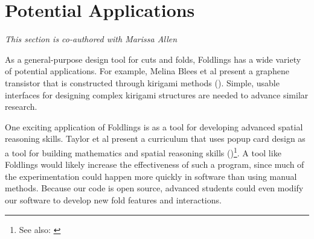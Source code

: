 \section{Potential Applications}\label{potential-applications}

\emph{This section is co-authored with Marissa Allen}

As a general-purpose design tool for cuts and folds, Foldlings has a
wide variety of potential applications. For example, Melina Blees et al
present a graphene transistor that is constructed through kirigami
methods (\citet{blees2014graphene}). Simple, usable interfaces for
designing complex kirigami structures are needed to advance similar
research.

One exciting application of Foldlings is as a tool for developing
advanced spatial reasoning skills. Taylor et al present a curriculum
that uses popup card design as a tool for building mathematics and
spatial reasoning skills (\citet{taylor2013think3d})\footnote{See also:
  \citet{olson_mathematics_2004}}. A tool like Foldlings would likely
increase the effectiveness of such a program, since much of the
experimentation could happen more quickly in software than using manual
methods. Because our code is open source, advanced students could even
modify our software to develop new fold features and interactions.
